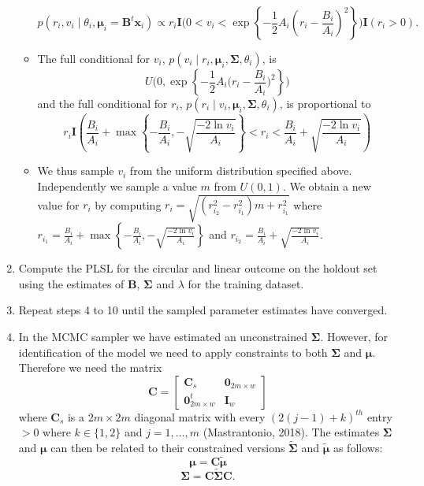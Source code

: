 \documentclass[12pt,]{article}
\begin{document}
\begin{enumerate}
\begin{itemize}
$$p(r_{i}, v_{i}\mid \theta_{i}, \boldsymbol{\mu}_{i}=\boldsymbol{B}^{t}\boldsymbol{x}_{i}) \propto r_{i} \textbf{I}\bigg(0 < v_i < \exp\left\{ -\frac{1}{2}A_i\left(r_{i} - \frac{B_i}{A_i}\right)^2\right\}\bigg)\textbf{I}(r_i > 0).$$
\item The full conditional for $v_{i}$, $p(v_{i} \mid r_{i},\boldsymbol{\mu}_{i}, \boldsymbol{\Sigma}, \theta_{i})$, is
$$U\Bigg(0, \exp\left\{-\frac{1}{2}A_i\bigg(r_i -  \frac{B_{i}}{A_i}\bigg)^2\right\}\Bigg)$$
and the full conditional for $r_i$, $p(r_{i} \mid v_{i},\boldsymbol{\mu}_{i}, \boldsymbol{\Sigma}, \theta_{i})$, is proportional to 
$$r_{i} \textbf{I}\left(\frac{B_i}{A_i} + \max\left\{-\frac{B_i}{A_i}, -\sqrt{\frac{-2\ln v_{i}}{A_i}}\right\} < r_{i} < \frac{B_i}{A_i} + \sqrt{\frac{-2\ln v_{i}}{A_i}}\right)$$
\item We thus sample $v_{i}$ from the uniform distribution specified above. Independently we sample a value $m$ from $U(0,1)$. We obtain a new value for $r_{i}$ by computing $r_{i} = \sqrt{(r_{i_{2}}^{2}-r_{i_{1}}^{2})m + r_{i_{1}}^{2}}$ where $r_{i_{1}}=\frac{B_i}{A_i} +\max\left\{-\frac{B_i}{A_i}, -\sqrt{\frac{-2\ln v_{i}}{A_i}}\right\}$ and $ r_{i_{2}}= \frac{B_i}{A_i} + \sqrt{\frac{-2\ln v_{i}}{A_i}}$.

\end{itemize}

\item Compute the PLSL for the circular and linear outcome on the holdout set using the estimates of $\boldsymbol{B}$, $\boldsymbol{\Sigma}$ and $\lambda$ for the training dataset.

\item Repeat steps 4 to 10 until the sampled parameter estimates have converged.

\item In the MCMC sampler we have estimated an unconstrained $\boldsymbol{\Sigma}$. However, for identification of the model we need to apply  constraints to both $\boldsymbol{\Sigma}$ and $\boldsymbol{\mu}$. Therefore we need the matrix
$$\boldsymbol{C} = \begin{bmatrix} \boldsymbol{C}_s & \boldsymbol{0}_{2m \times w} \\ \boldsymbol{0}_{2m \times w}^t & \boldsymbol{I}_w \end{bmatrix}$$
where $\boldsymbol{C}_s$ is a $2m \times 2m$ diagonal matrix with every $(2(j-1) + k)^{th}$ entry $> 0$ where $k \in \{1,2\}$ and $j = 1, \dots, m$ (Mastrantonio, 2018). The estimates $\boldsymbol{\Sigma}$ and $\boldsymbol{\mu}$ can then be related to their constrained versions $\tilde{\boldsymbol{\Sigma}}$ and $\tilde{\boldsymbol{\mu}}$ as follows:
$$\boldsymbol{\mu} = \boldsymbol{C}\tilde{\boldsymbol{\mu}}$$
$$\boldsymbol{\Sigma} = \boldsymbol{C}\tilde{\boldsymbol{\Sigma}}\boldsymbol{C}.$$

\end{enumerate}
\newpage
\end{document}

